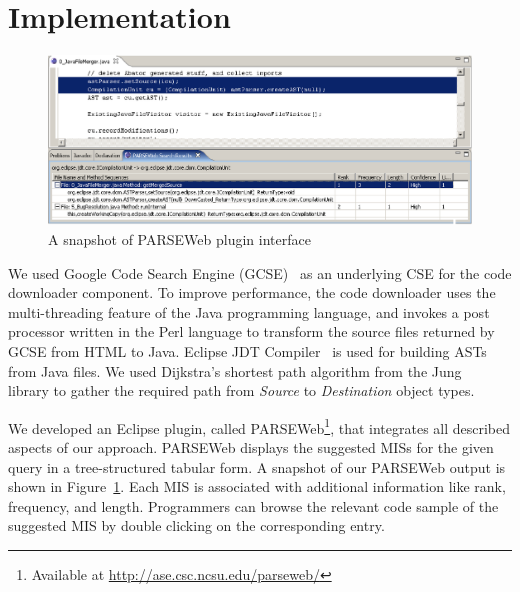 \documentclass{fp035-thummalapenta}
\begin{document}
\section{Implementation}
\label{sec:implementation}
\begin{figure}[t]
\centering
\includegraphics[scale=0.50,clip]{plugin_image1.eps}\vspace*{-2ex}
\caption{A snapshot of PARSEWeb plugin interface} \label{fig:plugin}
\vspace*{-2ex}
\end{figure}
We used Google Code Search Engine (GCSE)~\cite{GCSE} as an
underlying CSE for the code downloader component. To improve
performance, the code downloader uses the multi-threading feature of
the Java programming language, and
invokes a post processor written in the Perl language to transform
the source files returned by GCSE from HTML to Java. Eclipse JDT
Compiler~\cite{java:eclipse} is used for building ASTs from Java
files. We used
Dijkstra's shortest path algorithm from the Jung~\cite{Jung} library
 to gather the
required path from \emph{Source} to \emph{Destination} object types.

We developed an Eclipse plugin, called PARSEWeb\footnote{Available at
\url{http://ase.csc.ncsu.edu/parseweb/}}, that integrates all described aspects
of our approach. PARSEWeb displays the suggested MISs for the given
query in a tree-structured tabular form. A snapshot of our PARSEWeb
output is shown in Figure~\ref{fig:plugin}. Each MIS is associated
with additional information like rank, frequency, and length. Programmers can browse the
relevant code sample of the suggested MIS by double clicking on the
corresponding entry.
\end{document}
